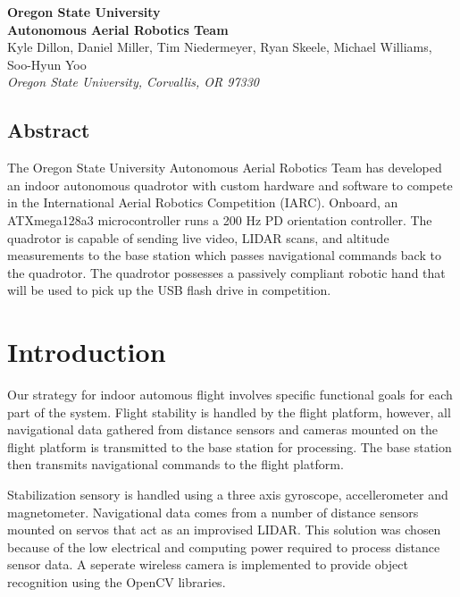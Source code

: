 \documentclass[12pt,letterpaper]{article}
\begin{document}
\begin{center}
{
    \bfseries\huge
    Oregon State University \\
    Autonomous Aerial Robotics Team \\ [1em]
}
{
    \small
    Kyle Dillon, Daniel Miller, Tim Niedermeyer, Ryan Skeele, Michael Williams, Soo-Hyun Yoo \\ [0.5em]
    \emph{Oregon State University, Corvallis, OR 97330}
}
\end{center}

\begin{center}
\begin{minipage}{5.5in}

\section*{Abstract}

The Oregon State University Autonomous Aerial Robotics Team has developed an
indoor autonomous quadrotor with custom hardware and software to compete in the
International Aerial Robotics Competition (IARC). Onboard, an ATXmega128a3
microcontroller runs a 200 Hz PD orientation controller. The quadrotor is
capable of sending live video, LIDAR scans, and altitude measurements to the
base station which passes navigational commands back to the quadrotor. The
quadrotor possesses a passively compliant robotic hand that will be used to
pick up the USB flash drive in competition.

\end{minipage}
\end{center}


\section*{Introduction}

Our strategy for indoor automous flight involves specific functional goals for
each part of the system. Flight stability is handled by the flight platform,
however, all navigational data gathered from distance sensors and cameras
mounted on the flight platform is transmitted to the base station for
processing. The base station then transmits navigational commands to the flight
platform.

Stabilization sensory is handled using a three axis gyroscope, accellerometer
and magnetometer. Navigational data comes from a number of distance sensors
mounted on servos that act as an improvised LIDAR. This solution was chosen
because of the low electrical and computing power required to process distance
sensor data. A seperate wireless camera is implemented to provide object
recognition using the OpenCV libraries.
\end{document}
